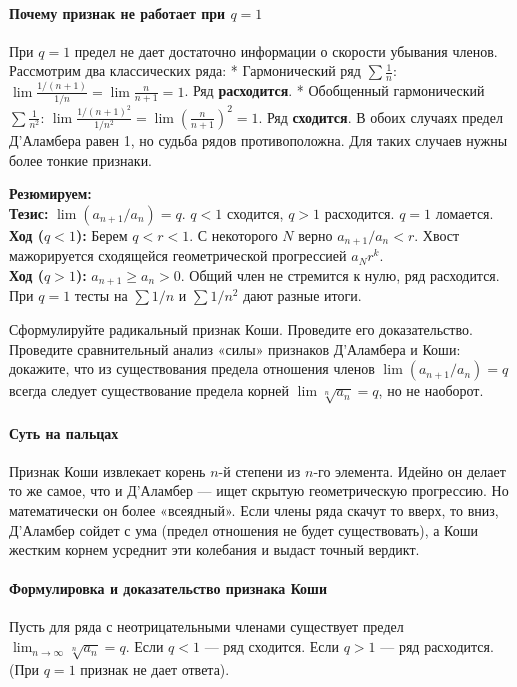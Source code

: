 \paragraph{Почему признак не работает при $q=1$}
При $q=1$ предел не дает достаточно информации о скорости убывания членов. Рассмотрим два классических ряда:
* Гармонический ряд $\sum \frac{1}{n}$: $\lim \frac{1/(n+1)}{1/n} = \lim \frac{n}{n+1} = 1$. Ряд \textbf{расходится}.
* Обобщенный гармонический $\sum \frac{1}{n^2}$: $\lim \frac{1/(n+1)^2}{1/n^2} = \lim \left(\frac{n}{n+1}\right)^2 = 1$. Ряд \textbf{сходится}.
В обоих случаях предел Д'Аламбера равен 1, но судьба рядов противоположна. Для таких случаев нужны более тонкие признаки.

\begin{tcolorbox}[colback=gray!5, colframe=black, boxrule=0.5pt, arc=0pt]
\textbf{Резюмируем:} \\
\textbf{Тезис:} $\lim (a_{n+1}/a_n) = q$. $q<1$ сходится, $q>1$ расходится. $q=1$ ломается. \\
\textbf{Ход ($q<1$):} Берем $q < r < 1$. С некоторого $N$ верно $a_{n+1}/a_n < r$. Хвост мажорируется сходящейся геометрической прогрессией $a_N r^k$. \\
\textbf{Ход ($q>1$):} $a_{n+1} \ge a_n > 0$. Общий член не стремится к нулю, ряд расходится. При $q=1$ тесты на $\sum 1/n$ и $\sum 1/n^2$ дают разные итоги.
\end{tcolorbox}

{Сформулируйте радикальный признак Коши. Проведите его доказательство. Проведите сравнительный анализ «силы» признаков Д'Аламбера и Коши: докажите, что из существования предела отношения членов $\lim(a_{n+1}/a_{n})=q$ всегда следует существование предела корней $\lim\sqrt[n]{a_{n}}=q$, но не наоборот.}

\paragraph{Суть на пальцах}
Признак Коши извлекает корень $n$-й степени из $n$-го элемента. Идейно он делает то же самое, что и Д'Аламбер — ищет скрытую геометрическую прогрессию. Но математически он более «всеядный». Если члены ряда скачут то вверх, то вниз, Д'Аламбер сойдет с ума (предел отношения не будет существовать), а Коши жестким корнем усреднит эти колебания и выдаст точный вердикт.

\paragraph{Формулировка и доказательство признака Коши}
Пусть для ряда с неотрицательными членами существует предел $\lim_{n \to \infty} \sqrt[n]{a_n} = q$.
Если $q < 1$ — ряд сходится. Если $q > 1$ — ряд расходится. (При $q=1$ признак не дает ответа).

